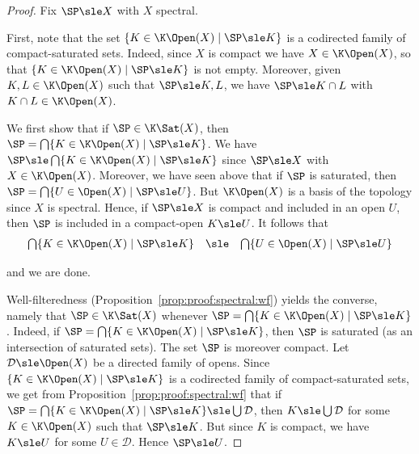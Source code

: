 \begin{proof}
Fix $\SP \sle X$ with $X$ spectral.

First, note that
the set $\{ K \in \K\Open(X) \mid \SP \sle K\}$
is a codirected family of compact-saturated sets.
Indeed, since $X$ is compact we have $X \in \K\Open(X)$,
so that $\{ K \in \K\Open(X) \mid \SP \sle K\}$ is not empty.
Moreover, given $K, L \in \K\Open(X)$ such that $\SP \sle K,L$,
we have $\SP \sle K \cap L$ with $K \cap L \in \K\Open(X)$.


We first show that if $\SP \in \K\Sat(X)$,
then $\SP = \bigcap \{ K \in \K\Open(X) \mid \SP  \sle K\}$.
We have $\SP \sle \bigcap \{ K \in \K\Open(X) \mid \SP  \sle K\}$
since $\SP \sle X$ with $X \in \K\Open(X)$.
Moreover, we have seen above that if $\SP$ is saturated,
then
$\SP = \bigcap \{ U \in \Open(X) \mid \SP  \sle U\}$.
But $\K\Open(X)$ is a basis of the topology since $X$ is spectral.
Hence, if $\SP \sle X$ is compact and included in an open $U$,
then $\SP$ is included in a compact-open $K \sle U$.
It follows that
\[
\begin{array}{l l l}
  \bigcap \{ K \in \K\Open(X) \mid \SP  \sle K \}
& \sle
& \bigcap \{ U \in \Open(X) \mid \SP  \sle U \}
\end{array}
\]

\noindent
and we are done.

Well-filteredness
(Proposition~\ref{prop:proof:spectral:wf}) yields the converse,
namely that $\SP \in \K\Sat(X)$ whenever
$\SP = \bigcap \{ K \in \K\Open(X) \mid \SP \sle K\}$.
Indeed, if $\SP = \bigcap \{ K \in \K\Open(X) \mid \SP \sle K\}$,
then $\SP$ is saturated (as an intersection of saturated sets).
The set $\SP$ is moreover compact.
Let $\mathcal{D} \sle \Open(X)$ be a directed family of opens.
Since $\{ K \in \K\Open(X) \mid \SP \sle K\}$
is a codirected family of compact-saturated sets,
we get from Proposition~\ref{prop:proof:spectral:wf}
that if
$\SP = \bigcap \{ K \in \K\Open(X) \mid \SP \sle K\} \sle \bigcup \mathcal{D}$,
then $K \sle \bigcup \mathcal{D}$ for some $K \in \K\Open(X)$ such that $\SP \sle K$.
But since $K$ is compact, we have $K \sle U$ for some $U \in \mathcal{D}$.
Hence $\SP \sle U$.
\end{proof}

